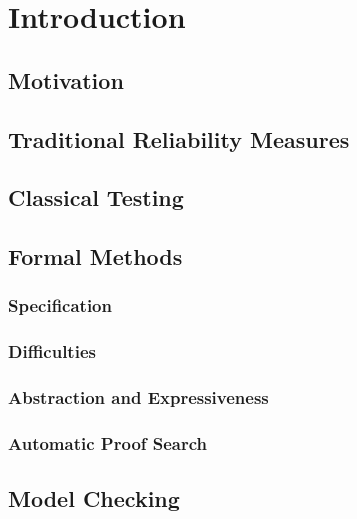 \chapter{Introduction}
	\section{Motivation} %

	\section{Traditional Reliability Measures} %

	\section{Classical Testing} %

	\section{Formal Methods} %

		\subsection{Specification} %

		\subsection{Difficulties} %

		\subsection{Abstraction and Expressiveness} %

		\subsection{Automatic Proof Search} %

	\section{Model Checking} %

